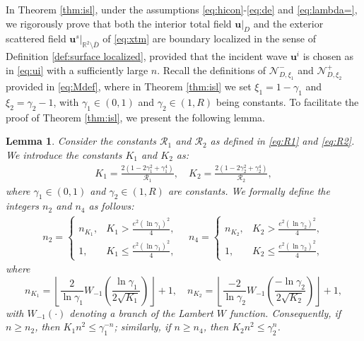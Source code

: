 \documentclass[11pt,reqno,twoside]{amsart}
\newtheorem{lem}{Lemma}[section]
\theoremstyle{definition}
\theoremstyle{remark}
\numberwithin{equation}{section}
\begin{document}
In Theorem \ref{thm:isl}, under the assumptions \eqref{eq:hicon}-\eqref{eq:de} and \eqref{eq:lambda=}, we rigorously prove that both the interior total field \( \mathbf{u}|_D \) and the exterior scattered field \( \mathbf{u}^s|_{\mathbb{R}^2 \setminus \overline{D}} \) of \eqref{eq:xtm} are boundary localized in the sense of  Definition \ref{def:surface localized}, provided that the incident wave \( \mathbf{u}^i \) is chosen as in \eqref{eq:ui} with a sufficiently large \( n \). Recall the definitions of \(\mathcal{N}_{D,\xi_{1}}^{-} \) and \(\mathcal{N}_{D,\xi_{2}}^{+} \) provided in \eqref{eq:Mdef}, where in  Theorem \ref{thm:isl} we set \(\xi_1 = 1 - \gamma_1\) and \(\xi_2 = \gamma_2 - 1\), with \(\gamma_1 \in (0, 1)\) and \(\gamma_2 \in (1, R)\) being constants. To facilitate the proof of Theorem \ref{thm:isl}, we present the following lemma.
\begin{lem}\label{lem:thmxy}
	Consider the constants $\mathcal{R}_1$ and $\mathcal{R}_2$ as defined in \eqref{eq:R1} and \eqref{eq:R2}. We introduce the constants \(K_1\) and \(K_2\) as:
	\begin{align}\label{eq:lemk1k2}
		K_{1} = \frac{2(1-2\gamma_{1}^2+\gamma_{1}^4)}{\mathcal{R}_{1}}, \quad K_{2} =\frac{2\left(1-2\gamma_{2}^2+\gamma_{2}^4\right)}{\mathcal{R}_{2}},
	\end{align}
	where \(\gamma_1 \in (0, 1)\) and \(\gamma_2 \in (1, R)\) are constants. We formally define the integers \(n_2\) and \(n_4\) as follows:
	\begin{align}\label{eq:n24}
		n_{2}=\left\{
		\begin{array}
			{ll}n_{K_{1}}, &K_{1} > \frac{e^2(\ln\gamma_{1})^2}{4}, \\
			1, & K_{1} \leq \frac{e^2(\ln\gamma_{1})^2}{4},
		\end{array}\right.\quad
		n_{4}=\left\{
		\begin{array}
			{ll}n_{K_{2}}, &K_{2} > \frac{e^2(\ln\gamma_{2})^2}{4}, \\
			1, & K_{2} \leq \frac{e^2(\ln\gamma_{2})^2}{4},
		\end{array}\right.
	\end{align}
	where
	\begin{displaymath}
		n_{K_{1}}= \left\lfloor\frac{2}{\ln\gamma_{1}}W_{-1}\left(\frac{\ln\gamma_{1}}{2\sqrt{K_{1}}}\right)\right\rfloor+1,\quad n_{K_{2}} = \left\lfloor\frac{-2}{\ln\gamma_{2}}W_{-1}\left(\frac{-\ln\gamma_{2}}{2\sqrt{K_{2}}}\right)\right\rfloor+1,
	\end{displaymath}
	with \(W_{-1}\left(\cdot\right)\) denoting a branch of the Lambert \(W\) function.
	Consequently, if \( n \geq n_2 \), then \( K_1 n^2 \leq \gamma_1^{-n} \); similarly, if \( n \geq n_4 \), then \( K_2 n^2 \leq \gamma_2^{n} \).
\end{lem}
\end{document}
